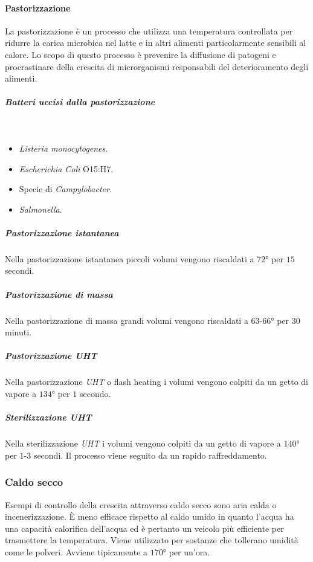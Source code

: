 			\paragraph{Pastorizzazione}
			La pastorizzazione è un processo che utilizza una temperatura controllata per ridurre la carica microbica nel latte e in altri alimenti particolarmente sensibili al calore. 
			Lo scopo di questo processo \`e prevenire la diffusione di patogeni e procrastinare della crescita di microrganismi responsabili del deterioramento degli alimenti. 
			
				\subparagraph{Batteri uccisi dalla pastorizzazione}\mbox{}\\
				\begin{multicols}{2}
					\begin{itemize}
						\item \textit{Listeria monocytogenes}.
						\item \textit{Escherichia Coli} O15:H7.
						\item Specie di \textit{Campylobacter}.
						\item \textit{Salmonella}.
					\end{itemize}
				\end{multicols}

				\subparagraph{Pastorizzazione istantanea}
				Nella pastorizzazione istantanea piccoli volumi vengono riscaldati a $72\si{\degree}$ per $15$ secondi.

				\subparagraph{Pastorizzazione di massa}
				Nella pastorizzazione di massa grandi volumi vengono riscaldati a $63$-$66\si{\degree}$ per $30$ minuti.

				\subparagraph{Pastorizzazione \emph{UHT}}
				Nella pastorizzazione \emph{UHT} o flash heating i volumi vengono colpiti da un getto di vapore a $134\si{\degree}$ per $1$ secondo.

				\subparagraph{Sterilizzazione \emph{UHT}}
				Nella sterilizzazione \emph{UHT} i volumi vengono colpiti da un getto di vapore a $140\si{\degree}$ per $1$-$3$ secondi.
				Il processo viene seguito da un rapido raffreddamento.
		
		\subsubsection{Caldo secco}
		Esempi di controllo della crescita attraverso caldo secco sono aria calda o incenerizzazione.
		\`E meno efficace rispetto al caldo umido in quanto l'acqua ha una capacit\`a calorifica dell'acqua ed \`e pertanto un veicolo pi\`u efficiente per trasmettere la temperatura.
		Viene utilizzato per sostanze che tollerano umidit\`a come le polveri.
		Avviene tipicamente a $170\si{\degree}$ per un'ora.

